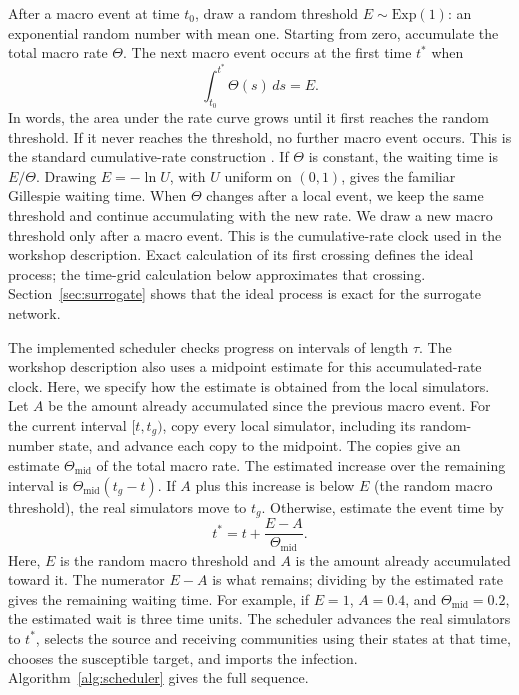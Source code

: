 \documentclass[a4paper,fleqn]{cas-sc}
\newcommand{\Exp}{\mathrm{Exp}}
\begin{document}
After a macro event at time $t_0$, draw a random threshold $E\sim\Exp(1)$: an exponential random number with mean one. Starting from zero, accumulate the total macro rate $\Theta$. The next macro event occurs at the first time $t^\ast$ when
\begin{equation}
\label{eq:hazard_integral}
\int_{t_0}^{t^\ast}\Theta(s)\,ds=E.
\end{equation}
In words, the area under the rate curve grows until it first reaches the random threshold. If it never reaches the threshold, no further macro event occurs. This is the standard cumulative-rate construction \citep{ethier1986,anderson2007}. If $\Theta$ is constant, the waiting time is $E/\Theta$. Drawing $E=-\ln U$, with $U$ uniform on $(0,1)$, gives the familiar Gillespie waiting time. When $\Theta$ changes after a local event, we keep the same threshold and continue accumulating with the new rate. We draw a new macro threshold only after a macro event. This is the cumulative-rate clock used in the workshop description. Exact calculation of its first crossing defines the ideal process; the time-grid calculation below approximates that crossing. Section~\ref{sec:surrogate} shows that the ideal process is exact for the surrogate network.

The implemented scheduler checks progress on intervals of length $\tau$. The workshop description also uses a midpoint estimate for this accumulated-rate clock. Here, we specify how the estimate is obtained from the local simulators. Let $A$ be the amount already accumulated since the previous macro event. For the current interval $[t,t_g)$, copy every local simulator, including its random-number state, and advance each copy to the midpoint. The copies give an estimate $\Theta_{\mathrm{mid}}$ of the total macro rate. The estimated increase over the remaining interval is $\Theta_{\mathrm{mid}}(t_g-t)$. If $A$ plus this increase is below $E$ (the random macro threshold), the real simulators move to $t_g$. Otherwise, estimate the event time by
\begin{equation}
\label{eq:interpolation}
t^\ast=t+\frac{E-A}{\Theta_{\mathrm{mid}}}.
\end{equation}
Here, $E$ is the random macro threshold and $A$ is the amount already accumulated toward it. The numerator $E-A$ is what remains; dividing by the estimated rate gives the remaining waiting time. For example, if $E=1$, $A=0.4$, and $\Theta_{\mathrm{mid}}=0.2$, the estimated wait is three time units. The scheduler advances the real simulators to $t^\ast$, selects the source and receiving communities using their states at that time, chooses the susceptible target, and imports the infection. Algorithm~\ref{alg:scheduler} gives the full sequence.
\end{document}

